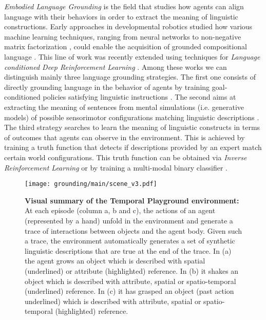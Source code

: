 \textit{Embodied Language Grounding} \cite{zwaan_madden_2005} is the field that studies how agents can align language with their behaviors in order to extract the meaning of linguistic constructions. Early approaches in developmental robotics studied how various machine learning techniques, ranging from neural networks \cite{sugita2005learning,tuci2011experiment,hinaut2014exploring} to non-negative matrix factorization \cite{mangin2015mca}, could enable the acquisition of grounded compositional language \cite{taniguchi2016symbol,tani2016exploring}.
This line of work was recently extended using techniques for \textit{Language conditioned Deep Reinforcement Learning} \cite{Luketina2019}. Among these works we can distinguish mainly three language grounding strategies. The first one consists of directly grounding language in the behavior of agents by training goal-conditioned policies satisfying linguistic instructions \cite{sugita2005learning,tuci2011experiment,hill2020environmental, hermann2017grounded, chaplot2018gatedattention}. The second aims at extracting the meaning of sentences from mental simulations (i.e. generative models) of possible sensorimotor configurations matching linguistic descriptions \cite{mangin2015mca,akakzia:hal-03121146,cideron2020higher, nguyen2021interactive}. The third strategy searches to learn the meaning of linguistic constructs in terms of outcomes that agents can observe in the environment. This is achieved by training a truth function that detects if descriptions provided by an expert match certain world configurations. This truth function can be obtained via \textit{Inverse Reinforcement Learning} \cite{zhou2020inverse, bahdanau2019learning} or by training a multi-modal binary classifier \cite{imagine}. %

\begin{figure}[t]
\centering
\texttt{[image: grounding/main/scene\_v3.pdf]}
\caption{\textbf{Visual summary of the Temporal Playground environment:} At each episode (column a, b and c), the actions of an agent (represented by a hand) unfold in the environment and generate a trace of interactions between objects and the agent body. Given such a trace, the environment automatically generates a set of  synthetic linguistic descriptions that are true at the end of the trace. In (a) the agent grows an object which is described with spatial (underlined) or attribute (highlighted) reference. In (b) it shakes an object which is described with attribute, spatial or spatio-temporal (underlined) reference. In (c) it has grasped an object (past action underlined) which is described with attribute, spatial or spatio-temporal (highlighted) reference.}
\label{fig:intro_schema}
\end{figure}

